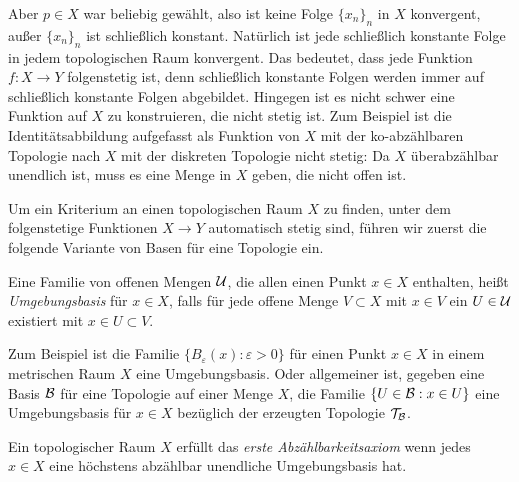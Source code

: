 Aber $p\in X$ war beliebig gewählt, also ist keine Folge $\{x_n\}_n$ in $X$ konvergent,
außer $\{x_n\}_n$ ist schließlich konstant. Natürlich ist jede schließlich
konstante Folge in jedem topologischen Raum konvergent. Das bedeutet, dass jede
Funktion $f\colon X\to Y$ folgenstetig ist, denn schließlich konstante Folgen
werden immer auf schließlich konstante Folgen abgebildet. Hingegen ist es nicht
schwer eine Funktion auf $X$ zu konstruieren, die nicht stetig ist. Zum Beispiel
ist die Identitätsabbildung aufgefasst als Funktion von $X$ mit der
ko-abzählbaren Topologie nach $X$ mit der diskreten Topologie nicht stetig: Da
$X$ überabzählbar unendlich ist, muss es eine Menge in $X$ geben, die nicht
offen ist.

Um ein Kriterium an einen topologischen Raum $X$ zu finden, unter dem folgenstetige Funktionen
$X\to Y$ automatisch stetig sind, führen wir zuerst die folgende Variante von
Basen für eine Topologie ein.

\begin{definition}
Eine Familie von offenen Mengen $\cal U$, die allen einen Punkt $x\in X$
enthalten, heißt \emph{Umgebungsbasis} für $x\in X$, falls für jede offene Menge
$V\subset X$ mit $x\in V$ ein $U\in\cal U$ existiert mit $x\in U\subset V$.
\end{definition}

Zum Beispiel ist die Familie $\{B_\varepsilon(x) : \varepsilon>0\}$ für einen
Punkt $x\in X$ in einem metrischen Raum $X$ eine Umgebungsbasis. Oder
allgemeiner ist, gegeben eine Basis $\cal B$ für eine Topologie auf einer Menge
$X$, die Familie $\{U\in\cal B : x\in U\}$ eine Umgebungsbasis für $x\in X$
bezüglich der erzeugten Topologie $\cal T_{\cal B}$.

\begin{definition}
Ein topologischer Raum $X$ erfüllt das \emph{erste Abzählbarkeitsaxiom} wenn
jedes $x\in X$ eine höchstens abzählbar unendliche Umgebungsbasis hat.
\end{definition}

